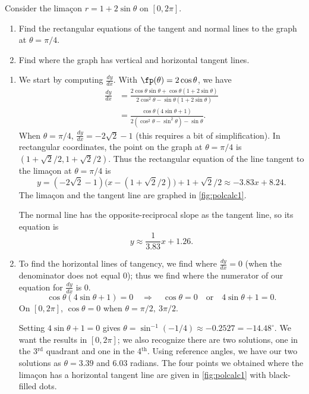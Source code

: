 {Consider the lima\c con $r=1+2\sin\theta$ on $[0,2\pi]$.
\begin{enumerate}
	\item	Find the rectangular equations of the tangent and normal lines to the graph at $\theta=\pi/4$.
	\item	Find where the graph has vertical and horizontal tangent lines.
\end{enumerate}
}
{\begin{enumerate}
	\item We start by computing $\frac{dy}{dx}$. With $\fp(\theta) = 2\cos\theta$, we have
	\begin{align*}
	\frac{dy}{dx} &= \frac{2\cos\theta\sin\theta + \cos\theta(1+2\sin\theta)}{2\cos^2\theta-\sin\theta(1+2\sin\theta)}\\
	&= \frac{\cos\theta(4\sin\theta+1)}{2(\cos^2\theta-\sin^2\theta)-\sin\theta}.
	\end{align*}
	When $\theta=\pi/4$, $\frac{dy}{dx}=-2\sqrt{2}-1$ (this requires a bit of simplification). In rectangular coordinates, the point on the graph at $\theta=\pi/4$ is $(1+\sqrt{2}/2,1+\sqrt{2}/2)$. Thus the rectangular equation of the line tangent to the lima\c con at $\theta=\pi/4$ is 
\[y=(-2\sqrt{2}-1)\big(x-(1+\sqrt{2}/2)\big)+1+\sqrt{2}/2 \approx  -3.83 x+8.24.\]
The lima\c con and the tangent line are graphed in \autoref{fig:polcalc1}. 
	
	The normal line has the opposite-reciprocal slope as the tangent line, so its equation is 
\[y \approx \frac{1}{3.83}x+1.26.\]
	
	\item		To find the horizontal lines of tangency, we find where $\frac{dy}{dx}=0$ (when the denominator does not equal 0); thus we find where the numerator of our equation for $\frac{dy}{dx}$ is 0.
	\[\cos\theta(4\sin\theta+1)=0\quad \Rightarrow \quad \cos\theta=0 \quad \text{or}\quad 4\sin\theta+1=0.\]
	On $[0,2\pi]$, $\cos\theta=0$ when $\theta=\pi/2,\ 3\pi/2$. 

Setting $4\sin\theta+1=0$ gives $\theta=\sin^{-1}(-1/4)\approx -0.2527 = -14.48^\circ$. We want the results in $[0,2\pi]$; we also recognize there are two solutions, one in the 3$^\text{rd}$ quadrant and one in the 4$^\text{th}$. Using reference angles, we have our two solutions as $\theta =3.39$ and $6.03$ radians. The four points we obtained where the lima\c con has a horizontal tangent line are given in \autoref{fig:polcalc1} with black-filled dots.\bigskip


\end{enumerate}}
